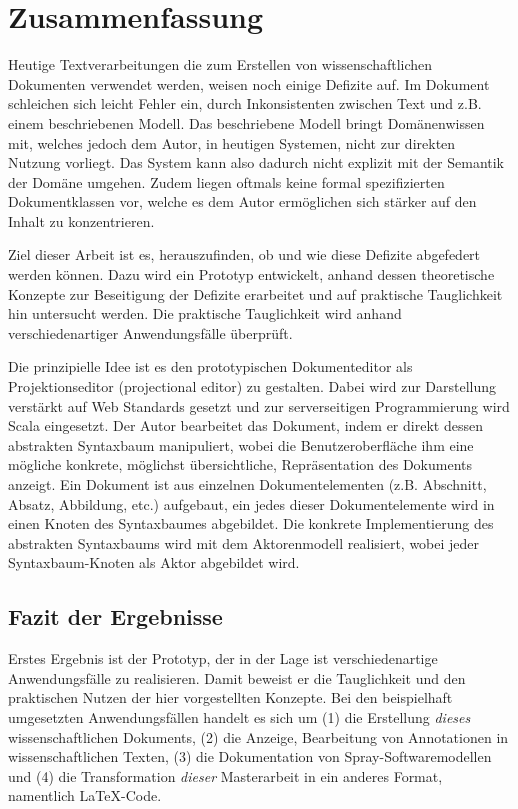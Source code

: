  
\chapter{Zusammenfassung}\label{}
 
Heutige Textverarbeitungen die zum Erstellen von wissenschaftlichen Dokumenten verwendet werden, weisen noch einige Defizite auf. Im Dokument schleichen sich leicht Fehler ein, durch Inkonsistenten zwischen Text und z.B. einem beschriebenen Modell. Das beschriebene Modell bringt Domänenwissen mit, welches jedoch dem Autor, in heutigen Systemen, nicht zur direkten Nutzung vorliegt. Das System kann also dadurch nicht explizit mit der Semantik der Domäne umgehen. Zudem liegen oftmals keine formal spezifizierten Dokumentklassen vor, welche es dem Autor ermöglichen sich stärker auf den Inhalt zu konzentrieren.

 
Ziel dieser Arbeit ist es, herauszufinden, ob und wie diese Defizite abgefedert werden können. Dazu wird ein Prototyp entwickelt, anhand dessen theoretische Konzepte zur Beseitigung der Defizite erarbeitet und auf praktische Tauglichkeit hin untersucht werden. Die praktische Tauglichkeit wird anhand verschiedenartiger Anwendungsfälle überprüft.

 
Die prinzipielle Idee ist es den prototypischen Dokumenteditor als Projektionseditor (projectional editor) zu gestalten. Dabei wird zur Darstellung verstärkt auf Web Standards gesetzt und zur serverseitigen Programmierung wird Scala eingesetzt. Der Autor bearbeitet das Dokument, indem er direkt dessen abstrakten Syntaxbaum manipuliert, wobei die Benutzeroberfläche ihm eine mögliche konkrete, möglichst übersichtliche, Repräsentation des Dokuments anzeigt. Ein Dokument ist aus einzelnen Dokumentelementen (z.B. Abschnitt, Absatz, Abbildung, etc.) aufgebaut, ein jedes dieser Dokumentelemente wird in einen Knoten des Syntaxbaumes abgebildet. Die konkrete Implementierung des abstrakten Syntaxbaums wird mit dem Aktorenmodell realisiert, wobei jeder Syntaxbaum-Knoten als Aktor abgebildet wird.

 
\section{Fazit der Ergebnisse}\label{}
 
Erstes Ergebnis ist der Prototyp, der in der Lage ist verschiedenartige Anwendungsfälle zu realisieren. Damit beweist er die Tauglichkeit und den praktischen Nutzen der hier vorgestellten Konzepte. Bei den beispielhaft umgesetzten Anwendungsfällen handelt es sich um (1) die Erstellung \emph{dieses} wissenschaftlichen Dokuments, (2) die Anzeige, Bearbeitung von Annotationen in wissenschaftlichen Texten, (3) die Dokumentation von Spray-Softwaremodellen und (4) die Transformation \emph{dieser} Masterarbeit in ein anderes Format, namentlich LaTeX-Code.

